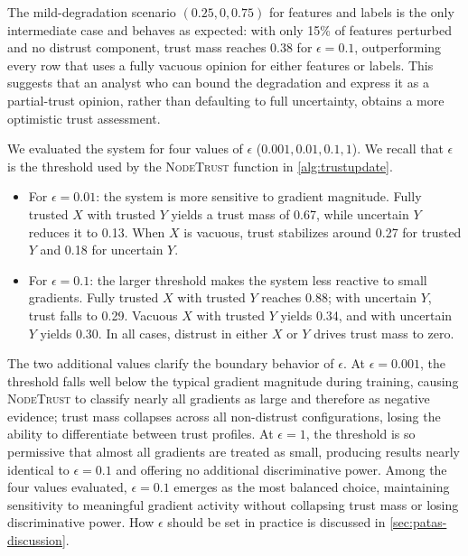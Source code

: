 The mild-degradation scenario $(0.25, 0, 0.75)$ for features and labels is the only intermediate case and behaves as expected: with only 15\% of features perturbed and no distrust component, trust mass reaches 0.38 for $\epsilon=0.1$, outperforming every row that uses a fully vacuous opinion for either features or labels. This suggests that an analyst who can bound the degradation and express it as a partial-trust opinion, rather than defaulting to full uncertainty, obtains a more optimistic trust assessment.

We evaluated the system for four values of $\epsilon$ ($0.001, 0.01, 0.1, 1$). We recall that $\epsilon$ is the threshold used by the \textsc{NodeTrust} function in \cref{alg:trustupdate}.
\begin{itemize}
\item For $\epsilon = 0.01$: the system is more sensitive to gradient magnitude. Fully trusted $X$ with trusted $Y$ yields a trust mass of 0.67, while uncertain $Y$ reduces it to 0.13. When $X$ is vacuous, trust stabilizes around 0.27 for trusted $Y$ and 0.18 for uncertain $Y$.
\item For $\epsilon = 0.1$: the larger threshold makes the system less reactive to small gradients. Fully trusted $X$ with trusted $Y$ reaches 0.88; with uncertain $Y$, trust falls to 0.29. Vacuous $X$ with trusted $Y$ yields 0.34, and with uncertain $Y$ yields 0.30. In all cases, distrust in either $X$ or $Y$ drives trust mass to zero.
\end{itemize}

The two additional values clarify the boundary behavior of $\epsilon$. At $\epsilon = 0.001$, the threshold falls well below the typical gradient magnitude during training, causing \textsc{NodeTrust} to classify nearly all gradients as large and therefore as negative evidence; trust mass collapses across all non-distrust configurations, losing the ability to differentiate between trust profiles. At $\epsilon = 1$, the threshold is so permissive that almost all gradients are treated as small, producing results nearly identical to $\epsilon = 0.1$ and offering no additional discriminative power. Among the four values evaluated, $\epsilon = 0.1$ emerges as the most balanced choice, maintaining sensitivity to meaningful gradient activity without collapsing trust mass or losing discriminative power. How $\epsilon$ should be set in practice is discussed in \cref{sec:patas-discussion}.

